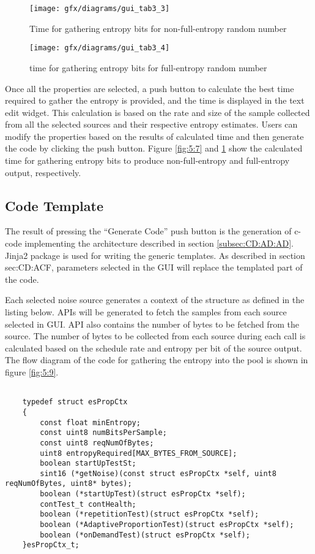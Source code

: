 \begin{figure}[!h]
	\centering
	\begin{minipage}[b]{5 cm}
		\texttt{[image: gfx/diagrams/gui\_tab3\_3]} 
		\caption{Time for gathering entropy bits for non-full-entropy random number}
		\label{fig:5:7}
	\end{minipage}
	\begin{minipage}[b]{5 cm}
		\texttt{[image: gfx/diagrams/gui\_tab3\_4]}  
		\caption{time for gathering entropy bits for full-entropy random number}
		\label{fig:5:8}
	\end{minipage}
\end{figure}

Once all the properties are selected, a push button to calculate the best time required to gather the entropy is provided, and the time is displayed in the text edit widget. This calculation is based on the rate and size of the sample collected from all the selected sources and their respective entropy estimates. Users can modify the properties based on the results of calculated time and then generate the code by clicking the push button. Figure \ref{fig:5:7} and \ref{fig:5:8} show the calculated time for gathering entropy bits to produce non-full-entropy and full-entropy output, respectively.

%
%
\subsection{Code Template}
\label{subsec:Imp:FI:CS}
The result of pressing the “Generate Code” push button is the generation of c-code implementing the architecture described in section \ref{subsec:CD:AD:AD}. Jinja2 package is used for writing the generic templates. As described in section {sec:CD:ACF}, parameters selected in the GUI will replace the templated part of the code.

Each selected noise source generates a context of the structure as defined in the listing below. APIs will be generated to fetch the samples from each source selected in GUI. API also contains the number of bytes to be fetched from the source. The number of bytes to be collected from each source during each call is calculated based on the schedule rate and entropy per bit of the source output. The flow diagram of the code for gathering the entropy into the pool is shown in figure \ref{fig:5:9}.

\begin{lstlisting}

	typedef struct esPropCtx
	{
		const float minEntropy;
		const uint8 numBitsPerSample;
		const uint8 reqNumOfBytes;
		uint8 entropyRequired[MAX_BYTES_FROM_SOURCE];
		boolean startUpTestSt;
		sint16 (*getNoise)(const struct esPropCtx *self, uint8 reqNumOfBytes, uint8* bytes);
		boolean (*startUpTest)(struct esPropCtx *self);
		contTest_t contHealth;
		boolean (*repetitionTest)(struct esPropCtx *self);
		boolean (*AdaptiveProportionTest)(struct esPropCtx *self);
		boolean (*onDemandTest)(struct esPropCtx *self);
	}esPropCtx_t;

\end{lstlisting}

